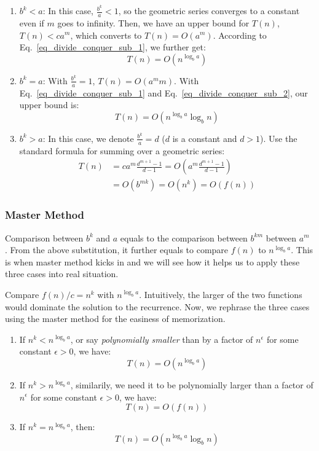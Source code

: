 \documentclass[../main.tex]{subfiles}
\begin{document}
\begin{enumerate}
    \item $b^k < a$: In this case, $\frac{b^k}{a}<1$, so the geometric series converges to a constant even if $m$ goes to infinity. Then, we have an upper bound for $T(n)$, $T(n)<ca^m$, which converts to $T(n)=O(a^m)$. According to Eq.~\ref{eq_divide_conquer_sub_1}, we further get:
    \begin{equation}
        T(n)=O(n^{\log_b a})
    \end{equation}
    \item $b^k = a$: With $\frac{b^k}{a}=1$, $T(n)=O(a^mm)$. With Eq.~\ref{eq_divide_conquer_sub_1} and Eq.~\ref{eq_divide_conquer_sub_2}, our upper bound is:
    \begin{equation}
        T(n)=O(n^{\log_b a}\log_b n)
    \end{equation}
    \item $b^k > a$: In this case, we denote $\frac{b^k}{a}=d$ ($d$ is a constant and $d>1$). Use the standard formula for summing over a geometric series:
    \begin{align}
        T(n)&=ca^m\frac{d^{m+1}-1}{d-1}=O(a^m\frac{d^{m+1}-1}{d-1})\\
        &=O(b^{mk})=O(n^k)=O(f(n))
    \end{align}
\end{enumerate}



\subsubsection{Master Method} Comparison between $b^k$ and $a$ equals to the comparison between $b^{km}$ between $a^m$ . From the above substitution, it further equals to compare  $f(n)$ to $n^{\log_b a}$. This is when master method kicks in and we will see how it helps us to apply these three cases into real situation. 

Compare   $f(n)/c=n^k$ with  $n^{\log_b a}$. Intuitively, the larger of the two functions would dominate the solution to the recurrence. Now, we rephrase the three cases using the master method for the easiness of memorization.  
\begin{enumerate}
    \item If $n^k<n^{\log_b a}$, or say \textit{polynomially smaller} than by a factor of $n^{\epsilon}$ for some constant $\epsilon > 0$, we have:
     \begin{equation}
        T(n)=O(n^{\log_b a})
    \end{equation}
    \item If $n^k>n^{\log_b a}$, similarily, we need it to be polynomially larger than a factor of $n^{\epsilon}$ for some constant $\epsilon > 0$, we have:
         \begin{equation}
        T(n)=O(f(n))
    \end{equation}
    \item If $n^k=n^{\log_b a}$, then:
        \begin{equation}
        T(n)=O(n^{\log_b a}\log_b n)
    \end{equation}
   
\end{enumerate}
\end{document}
